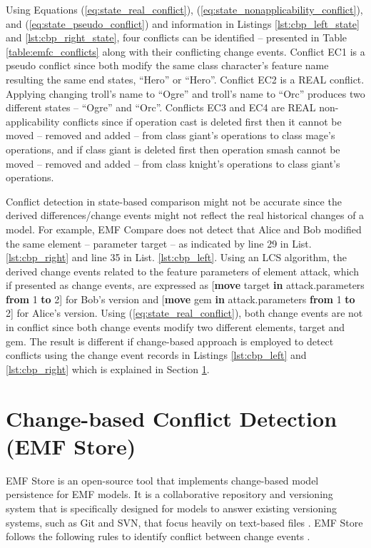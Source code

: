 Using Equations (\ref{eq:state_real_conflict}), (\ref{eq:state_nonapplicability_conflict}), and (\ref{eq:state_pseudo_conflict}) and information in Listings \ref{lst:cbp_left_state} and \ref{lst:cbp_right_state}, four conflicts can be identified -- presented in Table \ref{table:emfc_conflicts} along with their conflicting change events. Conflict \textsf{EC1} is a \textsf{pseudo} conflict since both modify the same class \textsf{character}'s feature \textsf{name} resulting the same end states, ``Hero'' or ``Hero''. Conflict \textsf{EC2} is a \textsf{REAL} conflict. Applying changing \textsf{troll}'s \textsf{name} to ``Ogre'' and \textsf{troll}'s \textsf{name} to ``Orc'' produces two different states -- ``Ogre'' and ``Orc''. Conflicts \textsf{EC3} and \textsf{EC4} are \textsf{REAL} non-applicability conflicts since if operation \textsf{cast} is deleted first then it cannot be moved -- removed and added -- from class \textsf{giant}'s \textsf{operations} to class \textsf{mage}'s \textsf{operations}, and if class \textsf{giant} is deleted first then operation \textsf{smash} cannot be moved -- removed and added -- from  class \textsf{knight}'s \textsf{operations} to class \textsf{giant}'s \textsf{operations}.

Conflict detection in state-based comparison might not be accurate since the derived differences/change events might not reflect the real historical changes of a model. For example, EMF Compare \cite{emfcompare2018developer} does not detect that Alice and Bob modified the same element -- parameter \textsf{target} -- as indicated by line 29 in List. \ref{lst:cbp_right} and line 35 in List. \ref{lst:cbp_left}. Using an LCS algorithm, the derived change events related to the feature \textsf{parameters} of element \textsf{attack}, which if presented as change events, are expressed as [\textsf{\small \textbf{move} target \textbf{in} attack.parameters \textbf{from} 1 \textbf{to} 2}] for Bob's version and [\textsf{\small \textbf{move} gem \textbf{in} attack.parameters \textbf{from} 1 \textbf{to} 2}] for Alice's version. Using (\ref{eq:state_real_conflict}), both change events are not in conflict since both change events modify two different elements, \textsf{target} and \textsf{gem}. The result is different if change-based approach is employed to detect conflicts using the change event records in Listings \ref{lst:cbp_left} and \ref{lst:cbp_right} which is explained in Section \ref{sec:emfstore_conflict_detection}.

\section{Change-based Conflict Detection (EMF Store)}
\label{sec:emfstore_conflict_detection}
EMF Store \cite{koegel2010emfstore} is an open-source tool that implements change-based model persistence for EMF models. It is a collaborative repository and versioning system that is specifically designed for models to answer existing versioning systems, such as Git and SVN, that focus heavily on text-based files \cite{emfstore2019what}. EMF Store follows the following rules to identify conflict between change events \cite{koegel2010operation}. 

